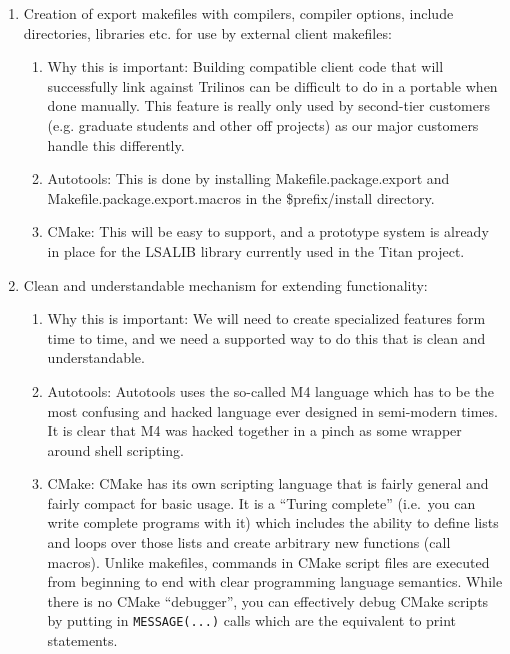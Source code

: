 \documentclass[pdf,ps2pdf,11pt]{SANDreport}
\begin{document}
\begin{enumerate}
{}\item Creation of export makefiles with compilers, compiler options,
include directories, libraries etc. for use by external client
makefiles:

  \begin{enumerate}

  {}\item Why this is important: Building compatible client code
  that will successfully link against Trilinos can be difficult to
  do in a portable when done manually.  This feature is really only used
  by second-tier customers (e.g. graduate students and other off
  projects) as our major customers handle this differently.

  {}\item Autotools: This is done by installing
  Makefile.package.export and Makefile.package.export.macros in the
  \$prefix/install directory.

  {}\item CMake: This will be easy to support, and a prototype system
  is already in place for the LSALIB library currently used in the
  Titan project.

  \end{enumerate}

{}\item Clean and understandable mechanism for extending
functionality:

  \begin{enumerate}

  {}\item Why this is important: We will need to create specialized
  features form time to time, and we need a supported way to do this
  that is clean and understandable.

  {}\item Autotools: Autotools uses the so-called M4 language which
  has to be the most confusing and hacked language ever designed in
  semi-modern times.  It is clear that M4 was hacked together in a
  pinch as some wrapper around shell scripting.

  {}\item CMake: CMake has its own scripting language that is fairly
  general and fairly compact for basic usage.  It is a ``Turing
  complete'' (i.e.\ you can write complete programs with it) which
  includes the ability to define lists and loops over those lists and
  create arbitrary new functions (call macros).  Unlike makefiles,
  commands in CMake script files are executed from beginning to end
  with clear programming language semantics.  While there is no CMake
  ``debugger'', you can effectively debug CMake scripts by putting in
  \texttt{MESSAGE(...)} calls which are the equivalent to print statements.


\end{enumerate}
\end{enumerate}
\end{document}
